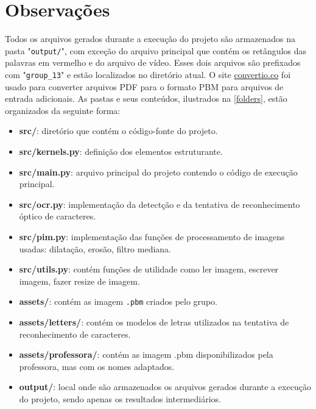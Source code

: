 \documentclass[english, 
               brazil, 
               bsc] %
               {dcomp-abntex2}
\begin{document}
\section{Observações}


Todos os arquivos gerados durante a execução do projeto são armazenados na pasta "\texttt{output/}", com exceção do arquivo principal que contém os retângulos das palavras em vermelho e do arquivo de vídeo. Esses dois arquivos são prefixados com "\texttt{group\_13}" e estão localizados no diretório atual.
O site \href{https://convertio.co/pdf-pbm/}{convertio.co} foi usado para converter arquivos PDF para o formato PBM para arquivos de entrada adicionais. As pastas e seus conteúdos, ilustrados na \autoref{folders}, estão organizados da seguinte forma:

\begin{itemize}
\item \textbf{src/}: diretório que contém o código-fonte do projeto.
\item \textbf{src/kernels.py}: definição dos elementos estruturante.
\item \textbf{src/main.py}: arquivo principal do projeto contendo o código de execução principal.
\item \textbf{src/ocr.py}: implementação da detectção e da tentativa de reconhecimento óptico de caracteres.
\item \textbf{src/pim.py}: implementação das funções de processamento de imagens usadas: dilatação, erosão, filtro mediana.
\item \textbf{src/utils.py}: contém funções de utilidade como ler imagem, escrever imagem, fazer resize de imagem.
\item \textbf{assets/}: contém as imagem \texttt{.pbm} criados pelo grupo.
\item \textbf{assets/letters/}: contém os modelos de letras utilizados na tentativa de reconhecimento de caracteres.
\item \textbf{assets/professora/}: contém as imagem .pbm disponibilizados pela professora, mas com os nomes adaptados.
\item \textbf{output/}: local onde são armazenados os arquivos gerados durante a execução do projeto, sendo apenas os resultados intermediários.
\end{itemize}
\end{document}
